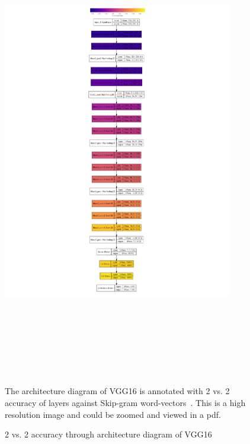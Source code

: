 \newpage
\begin{figure}[!hb]
\centering
\includegraphics[width=10cm, height=20cm]{Figures/vggnewarch}
\caption{2 vs. 2 accuracy through architecture diagram of VGG16}
\label{VGGARCH}
The architecture diagram of VGG16 is annotated with 2 vs. 2 accuracy of layers against Skip-gram word-vectors~\cite{VGG16}. This is a high resolution image and could be zoomed and viewed in a pdf.
\end{figure}


